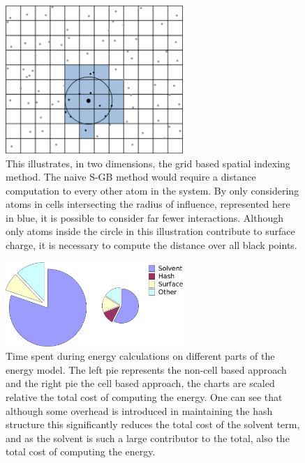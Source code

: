\begin{figure}[h]
\begin{center}
\includegraphics[width=0.6\textwidth]{figures/grid4_crop.png}
\caption{This illustrates, in two dimensions, the grid based spatial indexing method.
The naive S-GB method would require a distance computation to every other atom in the system.
By only considering atoms in cells intersecting the radius of influence, represented here in blue, it is possible to consider far fewer interactions.
Although only atoms inside the circle in this illustration contribute to surface charge, it is necessary to compute the distance over all black points.}
\label{fig:grid_hash}
\end{center}
\end{figure}

\begin{figure}[h]
\begin{center}
\includegraphics[width=0.6\textwidth]{figures/side_by_side.png}
\caption{Time spent during energy calculations on different parts of the energy model.
The left pie represents the non-cell based approach and the right pie the cell based approach, the charts are scaled relative the total cost of computing the energy.
One can see that although some overhead is introduced in maintaining the hash structure this significantly reduces the total cost of the solvent term, and as the solvent is such a large contributor to the total, also the total cost of computing the energy.}
\label{fig:timing_pie}
\end{center}
\end{figure}

